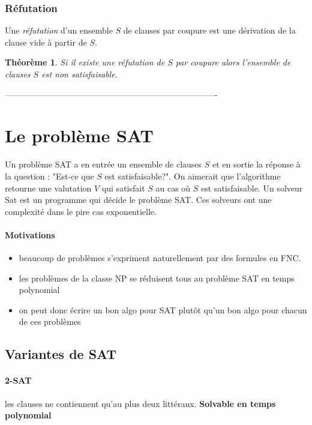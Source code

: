 \documentclass[a4paper]{article}
\newtheorem{theorem}{Théorème}[section]
\begin{document}
  \subsubsection{Réfutation}
  Une \textit{réfutation} d'un ensemble $S$ de clauses par coupure est 
une dérivation
  de la clause vide à partir de $S$.

  \begin{theorem}
  Si il existe une réfutation de $S$ par coupure alors l'ensemble de 
clauses $S$
  est non satisfaisable.
  \end{theorem}


% 
---------------------------------------------------------------------------- 
%
\section{Le problème SAT}

  Un problème SAT a en entrée un ensemble de clauses $S$ et en sortie la 
réponse à 
  la question : "Est-ce que $S$ est satisfaisable?". On aimerait que 
l'algorithme
  retourne une valutation $V$ qui satisfait $S$ au cas où $S$ est 
satisfaisable.
  Un solveur Sat est un programme qui décide le  problème SAT. Ces 
solveurs
  ont une complexité dans le pire cas exponentielle.

  \paragraph{Motivations}
  \begin{itemize}
    \item beaucoup de problèmes s'expriment naturellement par des 
formules en FNC.
    \item les problèmes de la classe NP se réduisent tous au problème 
SAT en temps polynomial
    \item on peut donc écrire un bon algo pour SAT plutôt qu'un bon algo 
pour chacun de ces problèmes
  \end{itemize}

  \subsection{Variantes de SAT}

    \paragraph{2-SAT} les clauses ne contiennent qu'au plus deux 
littéraux. \textbf{Solvable en temps polynomial}
    
\end{document}
